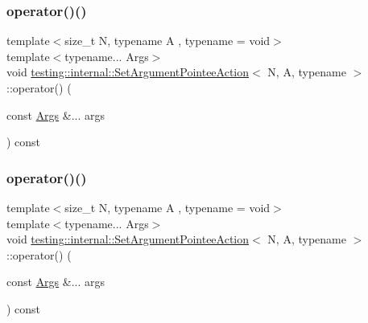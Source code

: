 \subsubsection{\texorpdfstring{operator()()}{operator()()}\hspace{0.1cm}{\footnotesize\ttfamily [1/2]}}
{\footnotesize\ttfamily template$<$size\+\_\+t N, typename A , typename  = void$>$ \\
template$<$typename... Args$>$ \\
void \mbox{\hyperlink{structtesting_1_1internal_1_1_set_argument_pointee_action}{testing\+::internal\+::\+Set\+Argument\+Pointee\+Action}}$<$ N, A, typename $>$\+::operator() (\begin{DoxyParamCaption}\item[{const \mbox{\hyperlink{namespacetesting_aaca153f67b689b8b9d5b8c67ecf8cee4}{Args}} \&...}]{args }\end{DoxyParamCaption}) const\hspace{0.3cm}{\ttfamily [inline]}}

\mbox{\label{structtesting_1_1internal_1_1_set_argument_pointee_action_ae3810c11f1d85e57d1466c7d6b214495}} 
\subsubsection{\texorpdfstring{operator()()}{operator()()}\hspace{0.1cm}{\footnotesize\ttfamily [2/2]}}
{\footnotesize\ttfamily template$<$size\+\_\+t N, typename A , typename  = void$>$ \\
template$<$typename... Args$>$ \\
void \mbox{\hyperlink{structtesting_1_1internal_1_1_set_argument_pointee_action}{testing\+::internal\+::\+Set\+Argument\+Pointee\+Action}}$<$ N, A, typename $>$\+::operator() (\begin{DoxyParamCaption}\item[{const \mbox{\hyperlink{namespacetesting_aaca153f67b689b8b9d5b8c67ecf8cee4}{Args}} \&...}]{args }\end{DoxyParamCaption}) const\hspace{0.3cm}{\ttfamily [inline]}}

